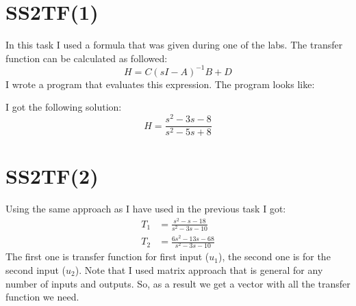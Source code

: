 \documentclass{article}
\begin{document}
\section{SS2TF(1)}
In this task I used a formula that was given during one of the labs.
The transfer function can be calculated as followed:
\begin{equation}
	H = C (sI - A) ^{-1} B + D
\end{equation}
I wrote a program that evaluates this expression.
The program looks like:

I got the following solution:
\begin{equation}
	H = \frac{s^2 - 3s - 8}{s ^ 2 - 5s + 8}
\end{equation}
\section{SS2TF(2)}
Using the same approach as I have used in the previous task I got:
\begin{align}
	T_1 &= \frac{s^2 - s - 18}{s^2 - 3s - 10}\\
	T_2 &= \frac{6s^2 - 13s - 68}{s^2 - 3s - 10}
\end{align}
The first one is transfer function for first input ($u_1$), the second one is for the second input ($u_2$).
Note that I used matrix approach that is general for any number of inputs and outputs. So, as a result we get a vector with all the transfer function we need.
\end{document}
